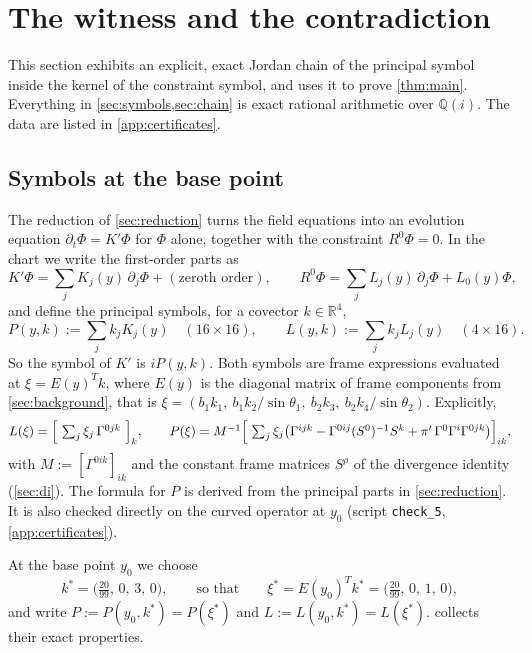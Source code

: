 \documentclass[11pt]{article}
\theoremstyle{plain}
\theoremstyle{definition}
\theoremstyle{remark}
\newcommand{\R}{\mathbb{R}}
\newcommand{\Q}{\mathbb{Q}}
\begin{document}
\section{The witness and the contradiction}\label{sec:witness}

This section exhibits an explicit, exact Jordan chain of the principal symbol inside the kernel of the constraint symbol, and uses it to prove \cref{thm:main}. Everything in \cref{sec:symbols,sec:chain} is exact rational arithmetic over $\Q(i)$. The data are listed in \cref{app:certificates}.

\subsection{Symbols at the base point}\label{sec:symbols}

The reduction of \cref{sec:reduction} turns the field equations into an evolution equation $\partial_t\Phi = K'\Phi$ for $\Phi$ alone, together with the constraint $R^0\Phi = 0$. In the chart we write the first-order parts as
\[
  K'\Phi = \sum_{j} K_j(y)\,\partial_j\Phi + (\text{zeroth order}),\qquad
  R^0\Phi = \sum_{j} L_j(y)\,\partial_j\Phi + L_0(y)\Phi ,
\]
and define the principal symbols, for a covector $k \in \R^4$,
\[
  P(y,k) := \sum_j k_j K_j(y) \quad (16\times 16), \qquad
  L(y,k) := \sum_j k_j L_j(y) \quad (4\times 16).
\]
So the symbol of $K'$ is $iP(y,k)$. Both symbols are frame expressions evaluated at $\xi = E(y)^{T}k$, where $E(y)$ is the diagonal matrix of frame components from \cref{sec:background}, that is $\xi = (b_1k_1,\ b_1k_2/\sin\theta_1,\ b_2k_3,\ b_2k_4/\sin\theta_2)$. Explicitly,
\[
  L(\xi) = \Bigl[\ \textstyle\sum_j \xi_j\,\Gamma^{0jk}\ \Bigr]_{k},\qquad
  P(\xi) = M^{-1}\Bigl[\ \textstyle\sum_j \xi_j\bigl(\Gamma^{ijk} - \Gamma^{0ij}(S^0)^{-1}S^k + \pi'\,\Gamma^0\Gamma^i\Gamma^{0jk}\bigr)\Bigr]_{ik},
\]
with $M := [\Gamma^{0ik}]_{ik}$ and the constant frame matrices $S^\rho$ of the divergence identity (\cref{sec:di}). The formula for $P$ is derived from the principal parts in \cref{sec:reduction}. It is also checked directly on the curved operator at $y_0$ (script \texttt{check\_5}, \cref{app:certificates}).

At the base point $y_0$ we choose
\[
  k^* = \bigl(\tfrac{20}{99},\,0,\,3,\,0\bigr), \qquad\text{so that}\qquad
  \xi^* = E(y_0)^{T}k^* = \bigl(\tfrac{20}{99},\,0,\,1,\,0\bigr),
\]
and write $P := P(y_0,k^*) = P(\xi^*)$ and $L := L(y_0,k^*) = L(\xi^*)$.  collects their exact properties.
\end{document}
